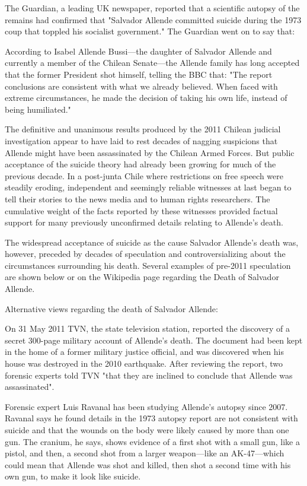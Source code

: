 The Guardian, a leading UK newspaper, reported that a scientific autopsy
of the remains had confirmed that "Salvador Allende committed suicide
during the 1973 coup that toppled his socialist government." The
Guardian went on to say that:

According to Isabel Allende Bussi---the daughter of Salvador Allende and
currently a member of the Chilean Senate---the Allende family has long
accepted that the former President shot himself, telling the BBC that:
"The report conclusions are consistent with what we already believed.
When faced with extreme circumstances, he made the decision of taking
his own life, instead of being humiliated."

The definitive and unanimous results produced by the 2011 Chilean
judicial investigation appear to have laid to rest decades of nagging
suspicions that Allende might have been assassinated by the Chilean
Armed Forces. But public acceptance of the suicide theory had already
been growing for much of the previous decade. In a post-junta Chile
where restrictions on free speech were steadily eroding, independent and
seemingly reliable witnesses at last began to tell their stories to the
news media and to human rights researchers. The cumulative weight of the
facts reported by these witnesses provided factual support for many
previously unconfirmed details relating to Allende's death.

The widespread acceptance of suicide as the cause Salvador Allende's
death was, however, preceded by decades of speculation and
controversializing about the circumstances surrounding his death.
Several examples of pre-2011 speculation are shown below or on the
Wikipedia page regarding the Death of Salvador Allende.

Alternative views regarding the death of Salvador Allende:

On 31 May 2011 TVN, the state television station, reported the discovery
of a secret 300-page military account of Allende's death. The document
had been kept in the home of a former military justice official, and was
discovered when his house was destroyed in the 2010 earthquake. After
reviewing the report, two forensic experts told TVN "that they are
inclined to conclude that Allende was assassinated".

Forensic expert Luis Ravanal has been studying Allende's autopsy since
2007. Ravanal says he found details in the 1973 autopsy report are not
consistent with suicide and that the wounds on the body were likely
caused by more than one gun. The cranium, he says, shows evidence of a
first shot with a small gun, like a pistol, and then, a second shot from
a larger weapon---like an AK-47---which could mean that Allende was shot
and killed, then shot a second time with his own gun, to make it look
like suicide.

